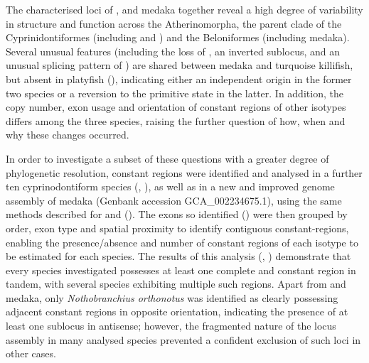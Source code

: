 The characterised \igh{} loci of \nfu, \xma and medaka together reveal a high degree of variability in structure and function across the Atherinomorpha, the parent clade of the Cyprinidontiformes (including \Nfu and \Xma) and the Beloniformes (including medaka). Several unusual features (including the loss of , an inverted sublocus, and an unusual splicing pattern of ) are shared between medaka and turquoise killifish, but absent in platyfish (), indicating either an independent origin in the former two species or a reversion to the primitive state in the latter. In addition, the copy number, exon usage and orientation of constant regions of other isotypes differs among the three species, raising the further question of how, when and why these changes occurred. 

In order to investigate a subset of these questions with a greater degree of phylogenetic resolution, \igh{} constant regions were identified and analysed in a further ten cyprinodontiform species (, ), as well as in a new and improved genome assembly of medaka (Genbank accession GCA\_002234675.1), using the same methods described for \Nfu and \Xma (). The exons so identified () were then grouped by order, exon type and spatial proximity to identify contiguous constant-regions, enabling the presence/absence and number of constant regions of each isotype to be estimated for each species. %
The results of this analysis (, ) demonstrate that every species investigated possesses at least one complete  and  constant region in tandem, with several species exhibiting multiple such regions. Apart from \Nfu and medaka, only \textit{Nothobranchius orthonotus} was identified as clearly possessing adjacent constant regions in opposite orientation, indicating the presence of at least one sublocus in antisense; however, the fragmented nature of the \igh{} locus assembly in many analysed species prevented a confident exclusion of such loci in other cases.


